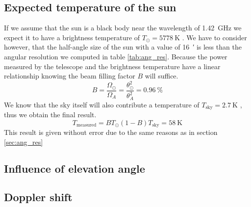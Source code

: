 \subsection{Expected temperature of the sun}\label{sec:temp}
If we assume that the sun is a black body near the wavelength of \SI{1.42}{\giga\hertz} we expect it to have a brightness temperature of $T_{\odot} = \SI{5778}{\kelvin}$ \cite[p. 211]{ftb}.
We have to consider however, that the half-angle size of the sun with a value of \SI{16}{\arcminute} \cite[p. 211]{ftb} is less than the angular resolution we computed in table \ref{tab:ang_res}.
Because the power measured by the telescope and the brightness temperature have a linear relationship knowing the beam filling factor $B$ will suffice.
\begin{equation}
    B = \frac{\Omega_{\odot}}{\Omega_A} = \frac{\theta_{\odot}^2}{\theta_A^2} = \SI{0.96
    }{\percent}
\end{equation}
We know that the sky itself will also contribute a temperature of $T_{\text{sky}} = \SI{2.7}{\kelvin}$ \cite[p. 4]{script}, thus we obtain the final result.
\begin{equation}
    T_{\text{measured}} = B T_{\odot} (1-B) T_{\text{sky}} = \SI{58}{\kelvin}
\end{equation}
This result is given without error due to the same reasons as in section \ref{sec:ang_res}


\subsection{Influence of elevation angle}

\subsection{Doppler shift}